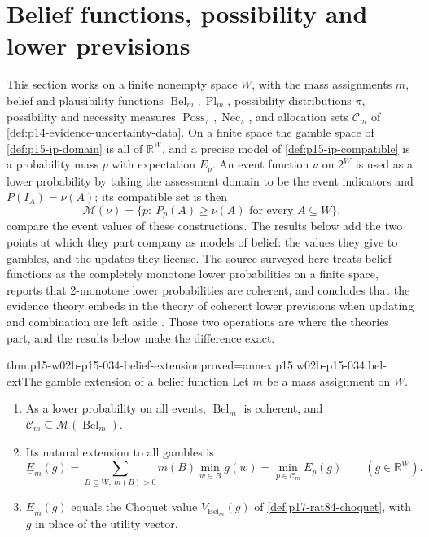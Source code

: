 \section{Belief functions, possibility and lower previsions}
\label{sec:p15-w02b-p15-034-evidence-models}

This section works on a finite nonempty space \(W\), with the mass
assignments \(m\), belief and plausibility functions
\(\operatorname{Bel}_m,\operatorname{Pl}_m\), possibility distributions
\(\pi\), possibility and necessity measures
\(\operatorname{Poss}_\pi,\operatorname{Nec}_\pi\), and allocation sets
\(\mathcal C_m\) of \cref{def:p14-evidence-uncertainty-data}. On a finite
space the gamble space of \cref{def:p15-ip-domain} is all of
\(\mathbb R^W\), and a precise model of \cref{def:p15-ip-compatible} is a
probability mass \(p\) with expectation \(E_p\). An event function
\(\nu\) on \(2^W\) is used as a lower probability by taking the
assessment domain to be the event indicators and
\(\underline P(I_A)=\nu(A)\); its compatible set is then
\[
 \mathcal M(\nu)=\{p:\ P_p(A)\geq\nu(A)\text{ for every }A\subseteq W\}.
\]
compare the event values of these constructions. The results below add the
two points at which they part company as models of belief: the values they
give to gambles, and the updates they license. The source surveyed here
treats belief functions as the completely monotone lower probabilities on a
finite space, reports that 2-monotone lower probabilities are coherent, and
concludes that the evidence theory embeds in the theory of coherent lower
previsions when updating and combination are left aside
\cite[§5.5, p.~34]{MirandaCoherentLowerPrevisionsCapture}. Those two
operations are where the theories part, and the results below make the
difference exact.

\begin{hbtheorem}{thm:p15-w02b-p15-034-belief-extension}{proved=annex:p15.w02b-p15-034.bel-ext}{The gamble extension of a belief function}
Let \(m\) be a mass assignment on \(W\).
\begin{enumerate}
\item As a lower probability on all events, \(\operatorname{Bel}_m\) is
coherent, and \(\mathcal C_m\subseteq\mathcal M(\operatorname{Bel}_m)\).
\item Its natural extension to all gambles is
\[
 \underline E_m(g)=\sum_{B\subseteq W,\ m(B)>0}m(B)\min_{w\in B}g(w)
 =\min_{p\in\mathcal C_m}E_p(g)\qquad(g\in\mathbb R^W).
\]
\item \(\underline E_m(g)\) equals the Choquet value
\(V_{\operatorname{Bel}_m}(g)\) of \cref{def:p17-rat84-choquet}, with
\(g\) in place of the utility vector.
\end{enumerate}
\end{hbtheorem}

